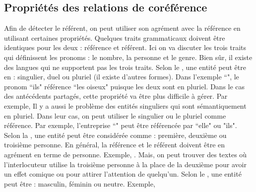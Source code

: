 \documentclass{KodeBook}
\begin{document}
\subsection{Propriétés des relations de coréférence}

Afin de détecter le référent, on peut utiliser son agrément avec la référence en utilisant certaines propriétés. 
Quelques traits grammaticaux doivent être identiques pour les deux : référence et référent. 
Ici on va discuter les trois traits qui définissent les pronoms : le nombre, la personne et le genre.
Bien sûr, il existe des langues qui ne supportent pas les trois traits. 
Selon le , une entité peut être en : singulier, duel ou pluriel (il existe d'autres formes). 
Dans l'exemple ``", le pronom ``ils" référence ``les oiseux" puisque les deux sont en pluriel. 
Dans le cas des antécédents partagés, cette propriété va être plus difficile à gérer.
Par exemple, 
Il y a aussi le problème des entités singuliers qui sont sémantiquement en pluriel. 
Dans leur cas, on peut utiliser le singulier ou le pluriel comme référence. 
Par exemple, l'entreprise ``" peut être référencée par ``elle" ou "ils".
%
Selon la , une entité peut être considérée comme : première, deuxième ou troisième personne. 
En général, la référence et le référent doivent être en agrément en terme de personne.
Exemple,  .
Mais, on peut trouver des textes où l'interlocuteur utilise la troisième personne à la place de la deuxième pour avoir un effet comique ou pour attirer l'attention de quelqu'un.
%
Selon le , une entité peut être : masculin, féminin ou neutre. 
Exemple, 
\end{document}
